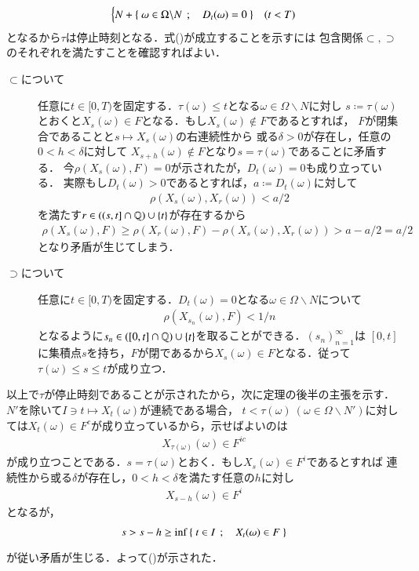 \begin{prf}
\begin{align}
\begin{cases}
				N + \left\{\ \omega \in \Omega \backslash N\ \, ; \quad D_t(\omega) = 0\ \right\} & (t < T)
 			\end{cases}
		\end{align}
		となるから$\tau$は停止時刻となる．式()が成立することを示すには
		包含関係$\subset,\supset$のそれぞれを満たすことを確認すればよい．
		\begin{description}
			\item[$\subset$について]
				任意に$t \in [0,T)$を固定する．$\tau(\omega) \leq t$となる$\omega \in \Omega \backslash N$に対し
				$s \coloneqq \tau(\omega)$とおくと$X_s(\omega) \in F$となる．もし$X_s(\omega) \notin F$であるとすれば，
				$F$が閉集合であることと$s \longmapsto X_s(\omega)$の右連続性から
				或る$\delta > 0$が存在し，任意の$0 < h < \delta$に対して
				$X_{s+h}(\omega) \notin F$となり$s = \tau(\omega)$であることに矛盾する．
				今$\rho(X_s(\omega),F) = 0$が示されたが，$D_t(\omega) = 0$も成り立っている．
				実際もし$D_t(\omega) > 0$であるとすれば，$a \coloneqq D_t(\omega)$に対して
				\begin{align}
					\rho(X_s(\omega), X_r(\omega)) < a/2
				\end{align}
				を満たす$r \in ((s,t] \cap \mathbb{Q}) \cup \{t\}$が存在するから
				\begin{align}
					\rho(X_s(\omega),F) \geq \rho(X_r(\omega),F) - \rho(X_s(\omega), X_r(\omega)) > a - a/2 = a/2
				\end{align}
				となり矛盾が生じてしまう．
			
			\item[$\supset$について]
				任意に$t \in [0,T)$を固定する．$D_t(\omega) = 0$となる$\omega \in \Omega \backslash N$について
				\begin{align}
					\rho(X_{s_n}(\omega),F) < 1/n
				\end{align}
				となるように$s_n \in ([0,t] \cap \mathbb{Q}) \cup \{t\}$を取ることができる．$(s_n)_{n=1}^{\infty}$は
				$[0,t]$に集積点$s$を持ち，$F$が閉であるから$X_s(\omega) \in F$となる．従って
				$\tau(\omega) \leq s \leq t$が成り立つ．
		\end{description}
		以上で$\tau$が停止時刻であることが示されたから，次に定理の後半の主張を示す．
		$N'$を除いて$I \ni t \longmapsto X_t(\omega)$が連続である場合，
		$t < \tau(\omega)\ (\omega \in \Omega \backslash N')$に対しては$X_t(\omega) \in F^c$が成り立っているから，示せばよいのは
		\begin{align}
			X_{\tau(\omega)}(\omega) \in F^{ic}
			\label{eq:closed_set_stopping_time_2}
		\end{align}
		が成り立つことである．$s = \tau(\omega)$とおく．もし$X_s(\omega) \in F^i$であるとすれば
		連続性から或る$\delta$が存在し，$0 < h < \delta$を満たす任意の$h$に対し
		\begin{align}
			X_{s - h}(\omega) \in F^i
		\end{align}
		となるが，
		\begin{align}
			s > s - h \geq \operatorname*{inf}_{} \left\{\ t \in I\ \, ; \quad X_t(\omega) \in F\ \right\}
		\end{align}
		が従い矛盾が生じる．よって()が示された．
		\QED
	\end{prf}
	